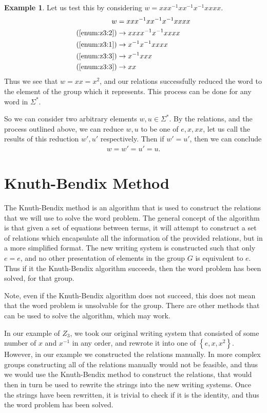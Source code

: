 \documentclass[10pt]{amsart}
\theoremstyle{definition}
\newtheorem*{iexample}{Example}
\theoremstyle{remark}
\newenvironment{example}{\begin{center}\begin{minipage}{0.9\textwidth}\begin{iexample}}{\end{iexample}\end{minipage}\end{center}}
\begin{document}
\begin{example}
  Let us test this by considering $w=xxx^{-1}xx^{-1}x^{-1}xxxx$.
  \begin{align*}
    w&=xxx^{-1}xx^{-1}x^{-1}xxxx\\
    (\ref{enum:z3:2})&\rightarrow xxxx^{-1}x^{-1}xxxx\\
    (\ref{enum:z3:1})&\rightarrow x^{-1}x^{-1}xxxx\\
    (\ref{enum:z3:3})&\rightarrow x^{-1}xxx\\
    (\ref{enum:z3:3})&\rightarrow xx\\
  \end{align*}
  Thus we see that $w=xx=x^2$, and our relations successfully reduced the word
  to the element of the group which it represents. This process can be done for
  any word in $\Sigma^*$.

  So we can consider two arbitrary elements $w,u\in\Sigma^*$. By the relations,
  and the process outlined above, we can reduce $w,u$ to be one of $e,x,xx$,
  let us call the results of this reduction $w',u'$ respectively. Then if
  $w'=u'$, then we can conclude
  \begin{align*}
    w=w'=u'=u.
  \end{align*}
\end{example}


\section{Knuth-Bendix Method}%
\label{sec:Knuth-Bendix Method}

The Knuth-Bendix method is an algorithm that is used to construct the relations
that we will use to solve the word problem. The general concept of the
algorithm is that given a set of equations between terms, it will attempt to
construct a set of relations which encapsulate all the information of the
provided relations, but in a more simplified format. The new writing system is
constructed such that only $e=e$, and no other presentation of elements in the
group $G$ is equivalent to $e$. Thus if it the Knuth-Bendix algorithm succeeds,
then the word problem has been solved, for that group.

Note, even if the Knuth-Bendix algorithm does not succeed, this does not mean
that the word problem is unsolvable for the group. There are other methods that
can be used to solve the algorithm, which may work.

In our example of $Z_3$, we took our original writing system that consisted of
some number of $x$ and $x^{-1}$ in any order, and rewrote it into one of
$\left\{e, x, x^2\right\}$. However, in our example we constructed the
relations manually. In more complex groups constructing all of the relations
manually would not be feasible, and thus we would use the Knuth-Bendix method
to construct the relations, that would then in turn be used to rewrite the
strings into the new writing systems. Once the strings have been rewritten, it
is trivial to check if it is the identity, and thus the word problem has been
solved.
\end{document}
